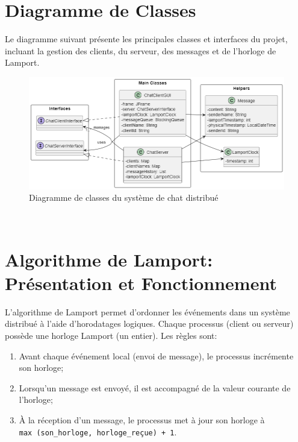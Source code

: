 \documentclass[a4paper,12pt]{article}
\begin{document}
\section{Diagramme de Classes}
Le diagramme suivant présente les principales classes et interfaces du projet, incluant la gestion des clients, du serveur, des messages et de l'horloge de Lamport.

\begin{figure}[ht!]
    \centering
    \includegraphics[width=1\textwidth]{class.png}
    \caption{Diagramme de classes du système de chat distribué}
\end{figure}
\FloatBarrier\


\section{Algorithme de Lamport: Présentation et Fonctionnement}
L'algorithme de Lamport permet d'ordonner les événements dans un système distribué à l'aide d'horodatages logiques. Chaque processus (client ou serveur) possède une horloge Lamport (un entier). Les règles sont:
\begin{enumerate}
    \item Avant chaque événement local (envoi de message), le processus incrémente son horloge;
    \item Lorsqu'un message est envoyé, il est accompagné de la valeur courante de l'horloge;
    \item À la réception d'un message, le processus met à jour son horloge à \\\texttt{max (son\_horloge, horloge\_reçue) + 1}.
\end{enumerate}
\end{document}
